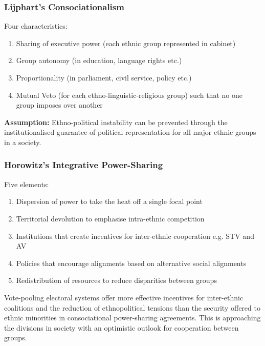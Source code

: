 \documentclass[12pt, letterpaper]{article}
\begin{document}
\subsubsection{Lijphart's Consociationalism}
Four characteristics:
\begin{enumerate}
	\item Sharing of executive power (each ethnic group represented in cabinet)
	\item Group autonomy (in education, language rights etc.)
	\item Proportionality (in parliament, civil service, policy etc.)
	\item Mutual Veto (for each ethno-linguistic-religious group) such that no one group imposes over another
\end{enumerate}
\textbf{Assumption:} Ethno-political instability can be prevented through the institutionalised guarantee of political representation for all major ethnic groups in a society.

\subsubsection{Horowitz's Integrative Power-Sharing}
Five elements:
\begin{enumerate}
	\item Dispersion of power to take the heat off a single focal point
	\item Territorial devolution to emphasise intra-ethnic competition
	\item Institutions that create incentives for inter-ethnic cooperation e.g. STV and AV
	\item Policies that encourage alignments based on alternative social alignments
	\item Redistribution of resources to reduce disparities between groups
\end{enumerate}
Vote-pooling electoral systems offer more effective incentives for inter-ethnic coalitions and the reduction of ethnopolitical tensions than the security offered to ethnic minorities in consociational power-sharing agreements. This is approaching the divisions in society with an optimistic outlook for cooperation between groups.
\end{document}
